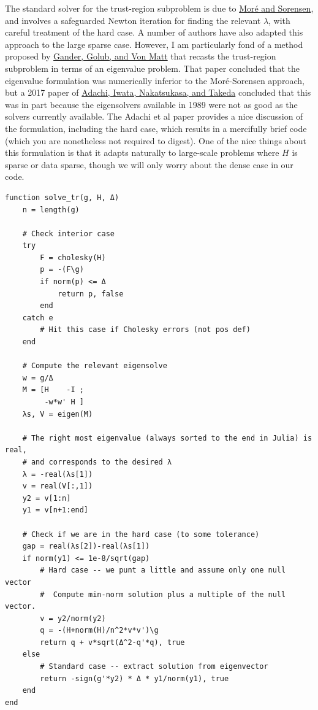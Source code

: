 \documentclass[12pt, leqno]{article} %
\begin{document}
The standard solver for the trust-region subproblem is due to
\href{https://doi.org/10.1137/0904038}{Moré and Sorensen}, and involves
a safeguarded Newton iteration for finding the relevant \(\lambda\),
with careful treatment of the hard case. A number of authors have also
adapted this approach to the large sparse case. However, I am
particularly fond of a method proposed by
\href{https://doi.org/10.1007/978-3-642-75536-1_57}{Gander, Golub, and
Von Matt} that recasts the trust-region subproblem in terms of an
eigenvalue problem. That paper concluded that the eigenvalue formulation
was numerically inferior to the Moré-Sorensen approach, but a 2017 paper
of \href{https://doi.org/10.1137/16M1058200}{Adachi, Iwata, Nakatsukasa,
and Takeda} concluded that this was in part because the eigensolvers
available in 1989 were not as good as the solvers currently available.
The Adachi et al paper provides a nice discussion of the formulation,
including the hard case, which results in a mercifully brief code (which
you are nonetheless not required to digest). One of the nice things
about this formulation is that it adapts naturally to large-scale
problems where \(H\) is sparse or data sparse, though we will only worry
about the dense case in our code.

\begin{verbatim}
function solve_tr(g, H, Δ)
    n = length(g)

    # Check interior case
    try
        F = cholesky(H)
        p = -(F\g)
        if norm(p) <= Δ
            return p, false
        end
    catch e
        # Hit this case if Cholesky errors (not pos def)
    end    

    # Compute the relevant eigensolve
    w = g/Δ
    M = [H    -I ;
         -w*w' H ]
    λs, V = eigen(M)
    
    # The right most eigenvalue (always sorted to the end in Julia) is real,
    # and corresponds to the desired λ
    λ = -real(λs[1])
    v = real(V[:,1])
    y2 = v[1:n]
    y1 = v[n+1:end]
    
    # Check if we are in the hard case (to some tolerance)
    gap = real(λs[2])-real(λs[1])
    if norm(y1) <= 1e-8/sqrt(gap)
        # Hard case -- we punt a little and assume only one null vector
        #  Compute min-norm solution plus a multiple of the null vector.
        v = y2/norm(y2)
        q = -(H+norm(H)/n^2*v*v')\g
        return q + v*sqrt(Δ^2-q'*q), true
    else
        # Standard case -- extract solution from eigenvector
        return -sign(g'*y2) * Δ * y1/norm(y1), true
    end
end
\end{verbatim}
\end{document}
